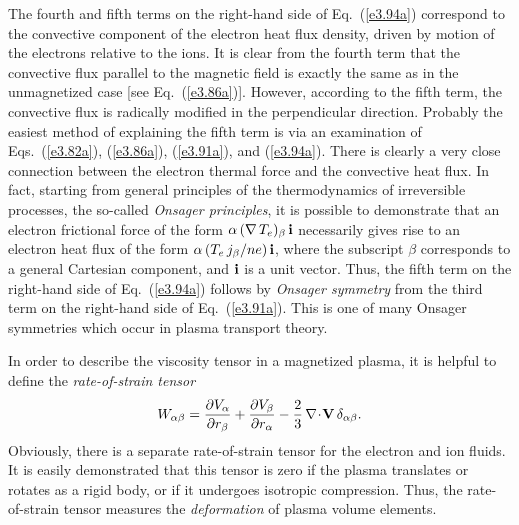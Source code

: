 The fourth and fifth terms on the right-hand side of Eq.~(\ref{e3.94a}) correspond to
the convective component of the electron heat flux density,  driven by
 motion of the electrons relative to the ions. It is clear from the
fourth  term that the convective flux parallel to the magnetic field is exactly the
same as in the unmagnetized case [see Eq.~(\ref{e3.86a})]. However, according to the fifth term, the
convective flux is radically modified in the perpendicular direction. 
Probably the easiest method of explaining the fifth
 term is via an examination
of Eqs.~(\ref{e3.82a}), (\ref{e3.86a}), (\ref{e3.91a}), and (\ref{e3.94a}). There is clearly a very close 
connection between the electron thermal force and the convective heat flux. 
In fact, starting from general principles of the thermodynamics of irreversible
processes, the so-called {\em Onsager principles}, it is possible to
demonstrate that an electron frictional force of the form 
$\alpha\,(\nabla\,T_e)_\beta\,{\bf i}$ necessarily gives rise to an electron heat flux
of the form $\alpha\,(T_e\,j_\beta/ne)\,{\bf i}$, where the
subscript $\beta$ corresponds to a general Cartesian component, and ${\bf i}$
is a unit vector. Thus, the fifth term on the right-hand side of Eq.~(\ref{e3.94a})
follows by {\em Onsager symmetry}\/ from the third term on the right-hand
side of Eq.~(\ref{e3.91a}). This is one of many Onsager symmetries which
occur in plasma transport theory. 

In order to describe the viscosity tensor in a magnetized plasma, it is
helpful to define the {\em rate-of-strain tensor}
\begin{equation}
W_{\alpha\beta} = \frac{\partial V_\alpha}{\partial r_\beta}
+ \frac{\partial V_\beta}{\partial r_\alpha} - \frac{2}{3} \,\nabla\!\cdot\!{\bf V}\,
\delta_{\alpha\beta}.
\end{equation}
Obviously, there is a separate rate-of-strain tensor for the electron and ion
fluids. It is easily demonstrated that this tensor is zero if the plasma
translates or rotates as a rigid body, or if it undergoes isotropic
compression. Thus, the rate-of-strain tensor measures the {\em deformation}\/  of
plasma volume elements. 

